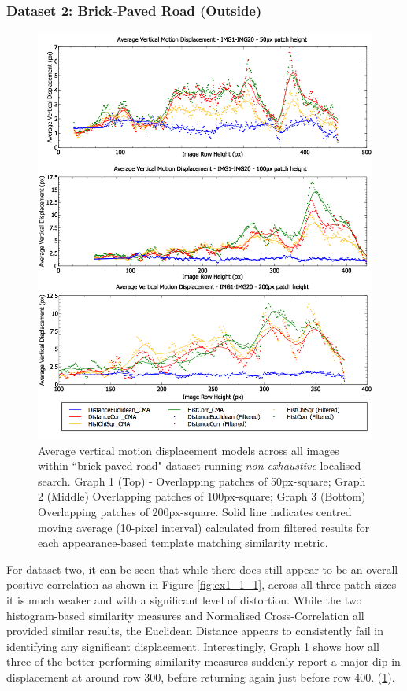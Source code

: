 \clearpage
\subsubsection{Dataset 2: Brick-Paved Road (Outside)}

\begin{figure}[ht!]
\centering
\includegraphics[scale=0.4]{images/results/ex1_results_outside_10cm}
\caption{Average vertical motion displacement models across all images within ``brick-paved road" dataset running \textit{non-exhaustive} localised search. Graph 1 (Top) - Overlapping patches of 50px-square; Graph 2 (Middle) Overlapping patches of 100px-square; Graph 3 (Bottom) Overlapping patches of 200px-square. Solid line indicates centred moving average (10-pixel interval) calculated from filtered results for each appearance-based template matching similarity metric.}
\label{fig:ex1_1_2}
\end{figure}

For dataset two, it can be seen that while there does still appear to be an overall positive correlation as shown in Figure \ref{fig:ex1_1_1}, across all three patch sizes it is much weaker and with a significant level of distortion. While the two histogram-based similarity measures and Normalised Cross-Correlation all provided similar results, the Euclidean Distance appears to consistently fail in identifying any significant displacement. Interestingly, Graph 1 shows how all three of the better-performing similarity measures suddenly report a major dip in displacement at around row 300, before returning again just before row 400. (\ref{fig:ex1_1_2}).

